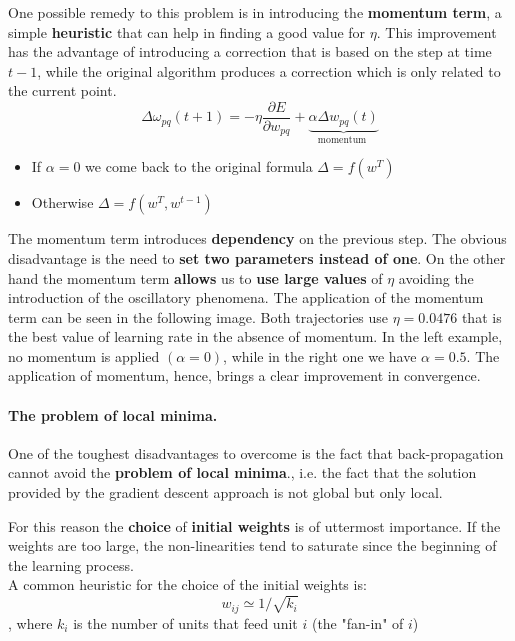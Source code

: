 One possible remedy to this problem is in introducing the \textbf{momentum term}, a simple \textbf{heuristic} that can help in finding a good value for $\eta$. This improvement has the advantage of introducing a correction that is based on the step at time $t-1$, while the original algorithm produces a correction which is only related to the current point.
$$\Delta \omega_{pq}(t+1) = -\eta \frac{\partial E}{\partial w_{pq}}+\underbrace{\alpha \Delta w_{pq} (t)}_{\text{momentum }}$$

\begin{itemize}
	\item If $\alpha = 0$ we come back to the original formula $\Delta = f(w^T)$
	\item Otherwise $\Delta = f(w^T, w^{t-1})$
\end{itemize}
The momentum term introduces \textbf{dependency} on the previous step. The obvious disadvantage is the need to \textbf{set two parameters instead of one}. On the other hand the momentum term \textbf{allows} us to \textbf{use large values} of $\eta$ avoiding the introduction of the oscillatory phenomena. The application of the momentum term can be seen in the following image.
Both trajectories use $\eta=0.0476$ that is the best value of learning rate in the absence of momentum. In the left example, no momentum is applied $(\alpha=0)$, while in the right one we have $\alpha=0.5$. The application of momentum, hence, brings a clear improvement in convergence.

\paragraph*{The problem of local minima.} One of the toughest disadvantages to overcome is the fact that back-propagation cannot avoid the \textbf{problem of local minima}., i.e. the fact that the solution provided by the gradient descent approach is not global but only local.


For this reason the \textbf{choice} of \textbf{initial weights} is of uttermost importance. If the weights are too large, the non-linearities tend to saturate since the beginning of the learning process. \\
A common heuristic for the choice of the initial weights is: 
$$w_{ij} \simeq 1/\sqrt{k_i}$$
, where $k_i$ is the number of units that feed unit $i$ (the "fan-in" of $i$)

